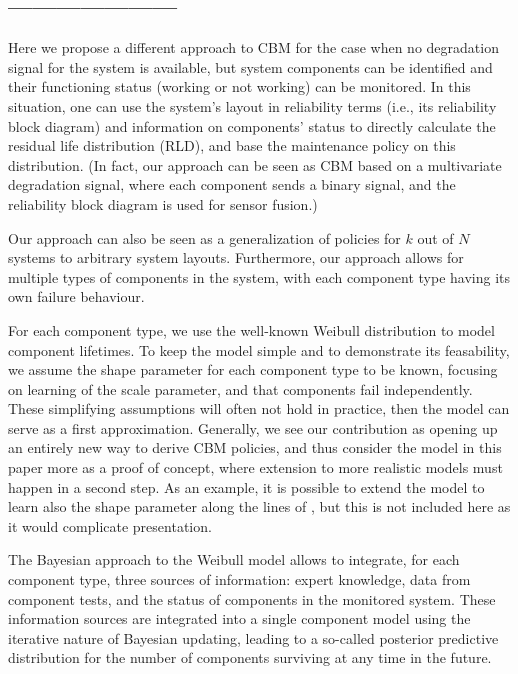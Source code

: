 \documentclass[authoryear]{elsarticle}
\begin{document}
\subsection*{---------------------}

Here we propose a different approach to CBM
for the case when no degradation signal for the system is available,
but system components can be identified and their functioning status
(working or not working) can be monitored.
In this situation, one can use the system's layout in reliability terms
(i.e., its reliability block diagram) and information on components' status
to directly calculate the residual life distribution (RLD),
and base the maintenance policy on this distribution.
(In fact, our approach can be seen as CBM based on a multivariate degradation signal,
where each component sends a binary signal, and the reliability block diagram is used
for sensor fusion.)

Our approach can also be seen as a generalization of policies for $k$ out of $N$ systems to arbitrary system layouts.
Furthermore, our approach allows for multiple types of components in the system,
with each component type having its own failure behaviour.

For each component type, we use the well-known Weibull distribution to model component lifetimes.
To keep the model simple and to demonstrate its feasability, we assume the shape parameter for each component type to be known,
focusing on learning of the scale parameter,
and that components fail independently.
These simplifying assumptions will often not hold in practice,
then the model can serve as a first approximation.
Generally, we see our contribution as opening up an entirely new way to derive CBM policies,
and thus consider the model in this paper more as a proof of concept,
where extension to more realistic models must happen in a second step.
As an example, it is possible to extend the model to learn also the shape parameter along the lines of
\cite{1969:soland},
but this is not included here as it would complicate presentation.

The Bayesian approach to the Weibull model \citep[see, e.g.,][]{1996:mazzuchi-soyer} allows to integrate, for each component type,
three sources of information: expert knowledge, data from component tests,
and the status of components in the monitored system. %
These information sources are integrated into a single component model
using the iterative nature of Bayesian updating,
leading to a so-called posterior predictive distribution for the number of components surviving at any time in the future.
\end{document}
